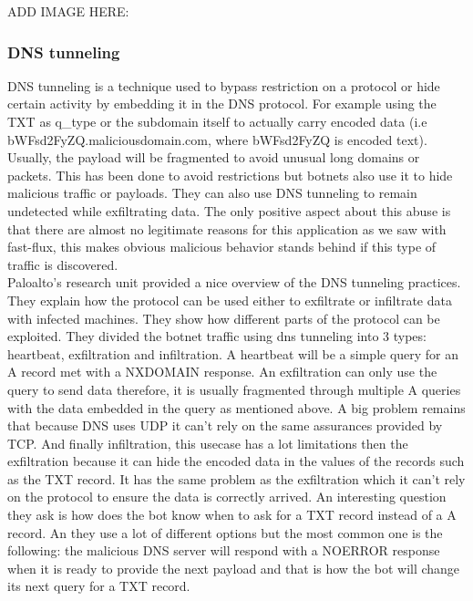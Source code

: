 ADD IMAGE HERE:
\cite{ff_visual}
\cite{ff2_visual}



\subsubsection{DNS tunneling}
DNS tunneling is a technique used to bypass restriction on a protocol or hide certain activity by embedding it in the DNS protocol. For example using the TXT  as q\_type or the subdomain itself to actually carry encoded data (i.e bWFsd2FyZQ.maliciousdomain.com, where bWFsd2FyZQ is encoded text). Usually, the payload will be fragmented to avoid unusual long domains or packets. This has been done to avoid restrictions but botnets also use it to hide malicious traffic or payloads. They can also use DNS tunneling to remain undetected \cite{Botnet1} while exfiltrating data. The only positive aspect about this abuse is that there are almost no legitimate reasons for this application as we saw with fast-flux, this makes obvious malicious behavior stands behind if this type of traffic is discovered.\cite{tunneling}
\\
Paloalto's research unit provided a nice overview of the DNS tunneling practices\cite{tunneling2}. They explain how the protocol can be used either to exfiltrate or infiltrate data with infected machines. They show how different parts of the protocol can be exploited. They divided the botnet traffic using dns tunneling into 3 types: heartbeat, exfiltration and infiltration. A heartbeat will be a simple query for an A record met with a NXDOMAIN response. An exfiltration can only use the query to send data therefore, it is usually fragmented through multiple A queries with the data embedded in the query as mentioned above. A big problem remains that because DNS uses UDP it can't rely on the same assurances provided by TCP. And finally infiltration, this usecase has a lot limitations then the exfiltration because it can hide the encoded data in the values of the records such as the TXT record. It has the same problem as the exfiltration which it can't rely on the protocol to ensure the data is correctly arrived.
An interesting question they ask is how does the bot know when to ask for a TXT record instead of a A record. An they use a lot of different options but the most common one is the following: the malicious DNS server will respond with a NOERROR response when it is ready to provide the next payload and that is how the bot will change its next query for a TXT record.


